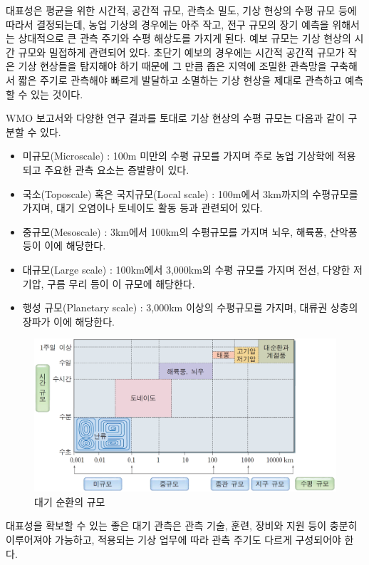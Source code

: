 대표성은 평균을 위한 시간적, 공간적 규모, 관측소 밀도, 기상 현상의 수평 규모 등에 따라서 결정되는데, 농업 기상의 경우에는 아주 작고, 전구 규모의 장기 예측을 위해서는 상대적으로 큰 관측 주기와 수평 해상도를 가지게 된다. 예보 규모는 기상 현상의 시간 규모와 밀접하게 관련되어 있다. 초단기 예보의 경우에는 시간적 공간적 규모가 작은 기상 현상들을 탐지해야 하기 때문에 그 만큼 좁은 지역에 조밀한 관측망을 구축해서 짧은 주기로 관측해야 빠르게 발달하고 소멸하는 기상 현상을 제대로 관측하고 예측할 수 있는 것이다. 

WMO 보고서와 다양한 연구 결과를 토대로 기상 현상의 수평 규모는 다음과 같이 구분할 수 있다.
\begin{itemize}
	\item 미규모(Microscale) : 100m 미만의 수평 규모를 가지며 주로 농업 기상학에 적용되고 주요한 관측 요소는 증발량이 있다.
	\item 국소(Toposcale) 혹은 국지규모(Local scale) : 100m에서 3km까지의 수평규모를 가지며, 대기 오염이나 토네이도 활동 등과 관련되어 있다.
	\item 중규모(Mesoscale) : 3km에서 100km의 수평규모를 가지며 뇌우, 해륙풍, 산악풍 등이 이에 해당한다.
	\item 대규모(Large scale) : 100km에서 3,000km의 수평 규모를 가지며 전선, 다양한 저기압, 구름 무리 등이 이 규모에 해당한다.
	\item 행성 규모(Planetary scale) : 3,000km 이상의 수평규모를 가지며, 대류권 상층의 장파가 이에 해당한다.
\end{itemize}

\begin{figure}
	\centering
	\includegraphics[width=0.8\linewidth]{21observing/images/C-E-o3O-F0-0301-00026-02}
	\caption{대기 순환의 규모}
	\label{fig:c-e-o3o-f0-0301-00026-02}
\end{figure}

대표성을 확보할 수 있는 좋은 대기 관측은 관측 기술, 훈련, 장비와 지원 등이 충분히 이루어져야 가능하고, 적용되는 기상 업무에 따라 관측 주기도 다르게 구성되어야 한다.

